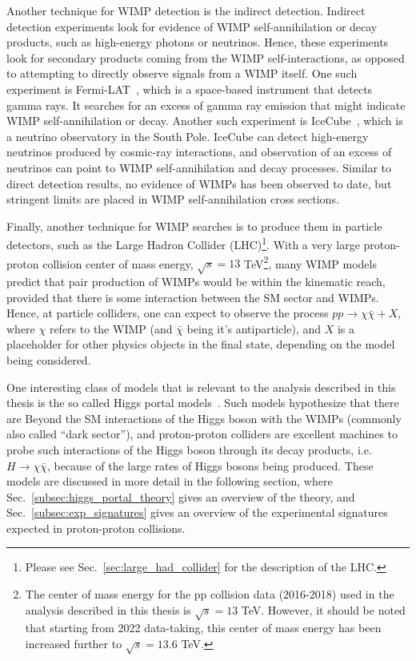 Another technique for WIMP detection is the indirect detection. Indirect detection experiments look 
for evidence of WIMP self-annihilation or decay products,
such as high-energy photons or neutrinos. Hence, these experiments look for secondary products coming from the WIMP
self-interactions, as opposed to attempting to directly observe signals from a WIMP itself. One such experiment is
Fermi-LAT~\cite{Fermi-LAT:2011vow}, which is a space-based instrument that detects gamma rays. It searches for an excess
of gamma ray emission that might indicate WIMP self-annihilation or decay. Another such experiment is IceCube~\cite{Iovine:2022aiw},
which is a neutrino observatory in the South Pole. IceCube can detect high-energy neutrinos produced by cosmic-ray interactions,
and observation of an excess of neutrinos can point to WIMP self-annihilation and decay processes. Similar to direct detection results,
no evidence of WIMPs has been observed to date, but stringent limits are placed in WIMP self-annihilation cross sections. 

Finally, another technique for WIMP searches is to produce them in particle detectors, such as the Large Hadron Collider 
(LHC)\footnote{Please see Sec.~\ref{sec:large_had_collider} for the description of the LHC.}. 
With a very large proton-proton collision
center of mass energy, $\sqrt{s} = 13$ TeV\footnote{The center of mass energy for the pp collision data (2016-2018) 
used in the analysis described in this thesis is $\sqrt{s} = 13$ TeV. 
However, it should be noted that starting from 2022 data-taking, this center of mass
energy has been increased further to $\sqrt{s} = 13.6$ TeV.}, many WIMP models predict that pair production of WIMPs would be
within the kinematic reach, provided that there is some interaction between the SM sector and WIMPs. Hence, at particle colliders,
one can expect to observe the process $pp \rightarrow \chi \bar{\chi} + X$, where $\chi$ refers to the WIMP (and $\bar{\chi}$ being
it's antiparticle), and $X$ is a placeholder for other physics objects in the final state, depending on the model being considered.

One interesting class of models that is relevant to the analysis described in this thesis is the so called Higgs portal models~\cite{Argyropoulos:2021sav}.
Such models hypothesize that there are Beyond the SM interactions of the Higgs boson with the WIMPs (commonly also called ``dark sector''),
and proton-proton colliders are excellent machines to probe such interactions of the Higgs boson through its decay products, i.e. 
$H \rightarrow \chi \bar{\chi}$, because of the large rates of Higgs bosons being produced. These models are discussed in more detail in the
following section, where Sec.~\ref{subsec:higgs_portal_theory} gives an overview of the theory, and Sec.~\ref{subsec:exp_signatures} gives an overview
of the experimental signatures expected in proton-proton collisions.  




